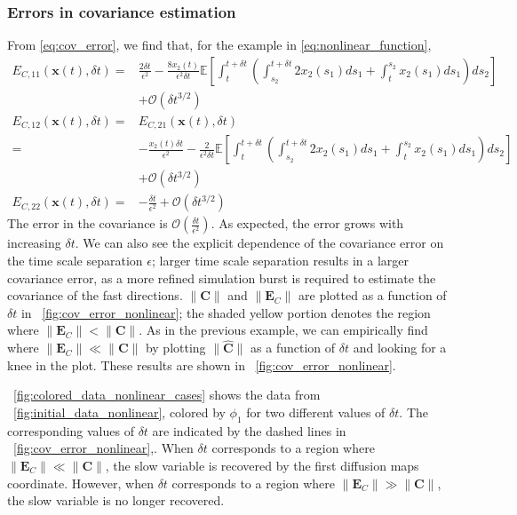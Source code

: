 \subsubsection{Errors in covariance estimation}

From \eqref{eq:cov_error}, we find that, for the example in \eqref{eq:nonlinear_function},
%
\begin{equation}
\begin{aligned}
E_{C,11} (\mathbf{x}(t), \delta t)
=&
\frac{2 \delta t}{\epsilon^2}
- \frac{8 x_2(t)}{\epsilon^2 \delta t} \mathbb{E} \left[ \int_t^{t+\delta t} \left( \int_{s_2}^{t+\delta t} 2 x_2(s_1) ds_1
+  \int_t^{s_2} x_2(s_1) ds_1 \right) ds_2\right]  \\ &+ \mathcal{O} (\delta t^{3/2}) \\
E_{C, 12} (\mathbf{x}(t), \delta t)
= &
E_{C, 21} (\mathbf{x}(t), \delta t)\\
=&
- \frac{x_2(t) \delta t}{\epsilon^2}
- \frac{2}{\epsilon^2 \delta t} \mathbb{E} \left[ \int_t^{t+\delta t} \left( \int_{s_2}^{t + \delta t} 2 x_2(s_1) ds_1 + \int_t^{s_2} x_2(s_1) ds_1 \right) ds_2 \right] \\ &+ \mathcal{O} (\delta t^{3/2})\\
E_{C, 22} (\mathbf{x}(t), \delta t)
=&
-\frac{\delta t}{\epsilon^2} + \mathcal{O} (\delta t^{3/2})
\end{aligned}
\end{equation}
%
The error in the covariance is $\mathcal{O} \left( \frac{\delta t}{\epsilon^2} \right)$.
%
As expected, the error grows with increasing $\delta t$.
%
We can also see the explicit dependence of the covariance error on the time scale separation $\epsilon$; larger time scale separation results in a larger covariance error, as a more refined simulation burst is required to estimate the covariance of the fast directions.
%
$\|\mathbf{C} \|$ and $\| \mathbf{E}_C\|  $ are plotted as a function of $\delta t$ in \fig~\ref{fig:cov_error_nonlinear}; the shaded yellow portion denotes the region where $\| \mathbf{E}_C \| < \| \mathbf{C} \|$.
%
As in the previous example, we can empirically find where $\| \mathbf{E}_C \| \ll \| \mathbf{C} \|$  by plotting $\| \widehat{\mathbf{C}} \|$ as a function of $\delta t $ and looking for a knee in the plot.
%
These results are shown in \fig~\ref{fig:cov_error_nonlinear}.

\fig~\ref{fig:colored_data_nonlinear_cases} shows the data from \fig~\ref{fig:initial_data_nonlinear}, colored by $\phi_1$ for two different values of $\delta t$.
%
The corresponding values of $\delta t$ are indicated by the dashed lines in \fig~\ref{fig:cov_error_nonlinear},.
%
When $\delta t$ corresponds to a region where $\|\mathbf{E}_C \| \ll \| \mathbf{C} \|$, the slow variable is recovered by the first diffusion maps coordinate.
%
However, when $\delta t$ corresponds to a region where $\|\mathbf{E}_C \| \gg \| \mathbf{C} \|$, the slow variable is no longer recovered.


